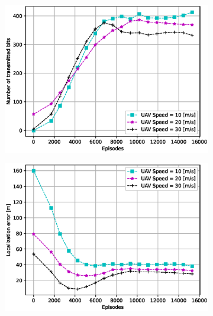 \documentclass[journal,twocolumn]{IEEEtran}
\begin{document}
{\begin{figure}
\captionsetup{justification=centering}
        \begin{subfigure}[b]{0.33\textwidth}
                \centering
                \includegraphics[width=1\linewidth]{Figures/my_figure_1.eps}
                \caption{}
                \label{fig.1a}
        \end{subfigure}%
        \begin{subfigure}[b]{0.33\textwidth}
                \centering
                \includegraphics[width=1\linewidth]{Figures/my_figure_2.eps}
                \caption{}
                \label{fig.1b}
        \end{subfigure}%
        \begin{subfigure}[b]{0.33\textwidth}

\end{subfigure}
\end{figure}}
\end{document}
